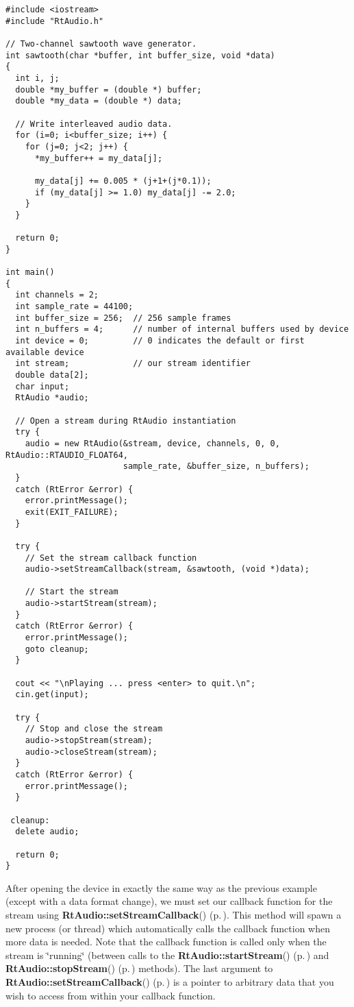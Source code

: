 \footnotesize\begin{verbatim}#include <iostream>
#include "RtAudio.h"

// Two-channel sawtooth wave generator.
int sawtooth(char *buffer, int buffer_size, void *data)
{
  int i, j;
  double *my_buffer = (double *) buffer;
  double *my_data = (double *) data;

  // Write interleaved audio data.
  for (i=0; i<buffer_size; i++) {
    for (j=0; j<2; j++) {
      *my_buffer++ = my_data[j];

      my_data[j] += 0.005 * (j+1+(j*0.1));
      if (my_data[j] >= 1.0) my_data[j] -= 2.0;
    }
  }

  return 0;
}

int main()
{
  int channels = 2;
  int sample_rate = 44100;
  int buffer_size = 256;  // 256 sample frames
  int n_buffers = 4;      // number of internal buffers used by device
  int device = 0;         // 0 indicates the default or first available device
  int stream;             // our stream identifier
  double data[2];
  char input;
  RtAudio *audio;

  // Open a stream during RtAudio instantiation
  try {
    audio = new RtAudio(&stream, device, channels, 0, 0, RtAudio::RTAUDIO_FLOAT64,
                        sample_rate, &buffer_size, n_buffers);
  }
  catch (RtError &error) {
    error.printMessage();
    exit(EXIT_FAILURE);
  }

  try {
    // Set the stream callback function
    audio->setStreamCallback(stream, &sawtooth, (void *)data);

    // Start the stream
    audio->startStream(stream);
  }
  catch (RtError &error) {
    error.printMessage();
    goto cleanup;
  }

  cout << "\nPlaying ... press <enter> to quit.\n";
  cin.get(input);

  try {
    // Stop and close the stream
    audio->stopStream(stream);
    audio->closeStream(stream);
  }
  catch (RtError &error) {
    error.printMessage();
  }

 cleanup:
  delete audio;

  return 0;
}\end{verbatim}\normalsize 


After opening the device in exactly the same way as the previous example (except with a data format change), we must set our callback function for the stream using {\bf Rt\-Audio::set\-Stream\-Callback}() {\rm (p.\,\pageref{classRtAudio_a4})}. This method will spawn a new process (or thread) which automatically calls the callback function when more data is needed. Note that the callback function is called only when the stream is \char`\"{}running\char`\"{} (between calls to the {\bf Rt\-Audio::start\-Stream}() {\rm (p.\,\pageref{classRtAudio_a11})} and {\bf Rt\-Audio::stop\-Stream}() {\rm (p.\,\pageref{classRtAudio_a12})} methods). The last argument to {\bf Rt\-Audio::set\-Stream\-Callback}() {\rm (p.\,\pageref{classRtAudio_a4})} is a pointer to arbitrary data that you wish to access from within your callback function.

